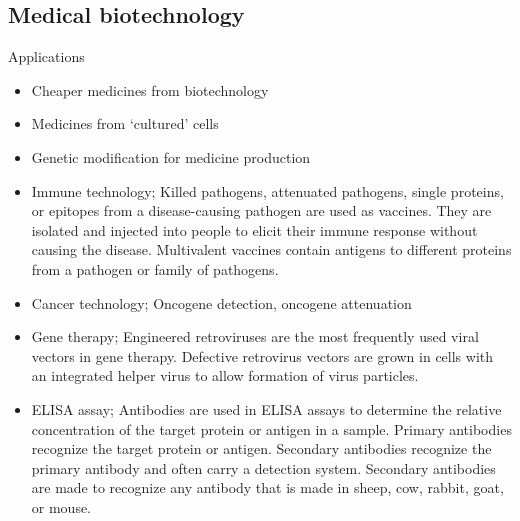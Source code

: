\documentclass[
  ignorenonframetext,
  aspectratio=169]{beamer}
\providecommand{\tightlist}{%
  \setlength{\itemsep}{0pt}\setlength{\parskip}{0pt}}
\begin{document}
\hypertarget{medical-biotechnology}{%
\subsection{Medical biotechnology}\label{medical-biotechnology}}

\begin{frame}{Applications}
\protect\hypertarget{applications-1}{}
\begin{itemize}
\tightlist
\item
  Cheaper medicines from biotechnology
\item
  Medicines from `cultured' cells
\item
  Genetic modification for medicine production
\item
  Immune technology; Killed pathogens, attenuated pathogens, single
  proteins, or epitopes from a disease-causing pathogen are used as
  vaccines. They are isolated and injected into people to elicit their
  immune response without causing the disease. Multivalent vaccines
  contain antigens to different proteins from a pathogen or family of
  pathogens.
\item
  Cancer technology; Oncogene detection, oncogene attenuation
\end{itemize}
\end{frame}

\begin{frame}{}
\protect\hypertarget{section-4}{}
\begin{itemize}
\tightlist
\item
  Gene therapy; Engineered retroviruses are the most frequently used
  viral vectors in gene therapy. Defective retrovirus vectors are grown
  in cells with an integrated helper virus to allow formation of virus
  particles.
\item
  ELISA assay; Antibodies are used in ELISA assays to determine the
  relative concentration of the target protein or antigen in a sample.
  Primary antibodies recognize the target protein or antigen. Secondary
  antibodies recognize the primary antibody and often carry a detection
  system. Secondary antibodies are made to recognize any antibody that
  is made in sheep, cow, rabbit, goat, or mouse.
\end{itemize}
\end{frame}
\end{document}

